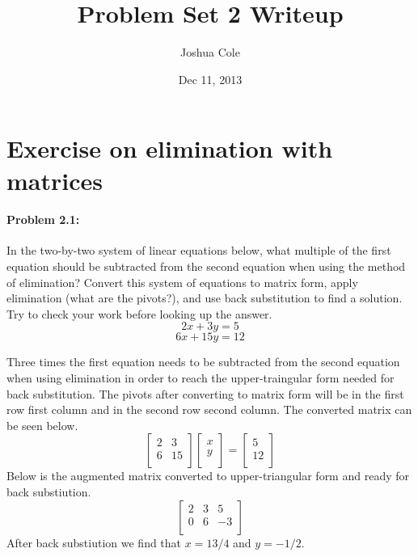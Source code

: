 \documentclass {article}
\begin{document}
\title {Problem Set 2 Writeup}
\author {Joshua Cole}
\date {Dec 11, 2013}
\maketitle
\section {Exercise on elimination with matrices}
\paragraph{Problem 2.1:}
In the two-by-two system of linear equations below, what multiple of the ﬁrst equation should be subtracted from the second equa­tion when using the method of elimination? Convert this system of equa­tions to matrix form, apply elimination (what are the pivots?), and use 
back substitution to ﬁnd a solution. Try to check your work before look­ing up the answer. 
$$2x + 3y = 5$$
$$6x + 15y = 12$$

Three times the first equation needs to be subtracted from the second equation when using elimination in order to reach the upper-traingular form needed for back substitution. The pivots after converting to matrix form will be in the first row first column and in the second row second column. The converted matrix can be seen below.
$$
\begin{bmatrix}
   2 & 3 \\
   6 & 15 \\ 
\end{bmatrix}
\begin{bmatrix}
   x \\
   y  \\ 
\end{bmatrix}
=
\begin{bmatrix}
  5 \\
  12  \\ 
\end{bmatrix}
$$
Below is the augmented matrix converted to upper-triangular form and ready for back substiution.
$$
\begin{bmatrix}
   2 & 3 & 5 \\
   0 & 6 & -3 \\ 
\end{bmatrix}
$$
After back substiution we find that $x=13/4$ and $y=-1/2$.
\end{document}
